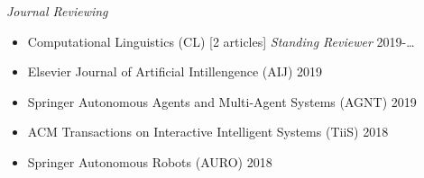 \documentclass{res}
\begin{document}
\begin{resume}
{\sl Journal Reviewing}
  \begin{itemize}
    \item Computational Linguistics (CL) [2 articles] \hfill {\it Standing Reviewer} 2019-\dots
    \item Elsevier Journal of Artificial Intillengence (AIJ) \hfill 2019
    \item Springer Autonomous Agents and Multi-Agent Systems (AGNT) \hfill 2019
    \item ACM Transactions on Interactive Intelligent Systems (TiiS) \hfill 2018
    \item Springer Autonomous Robots (AURO) \hfill 2018
  \end{itemize}
 
\end{resume} 
\end{document}
